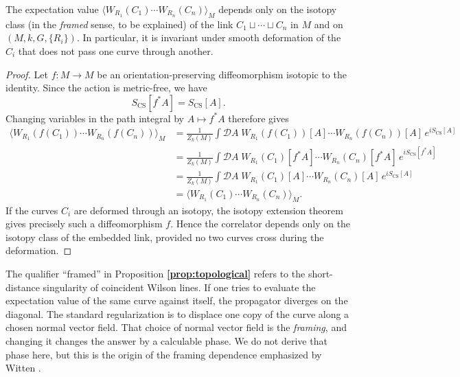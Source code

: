 \documentclass[11pt]{article}
\newcommand{\CS}{\operatorname{CS}}
\theoremstyle{definition}
\numberwithin{theorem}{section}
\numberwithin{equation}{section}
\begin{document}
\begin{proposition}\label{prop:topological}
The expectation value $\langle W_{R_1}(C_1)\cdots W_{R_n}(C_n)\rangle_M$ depends only on the isotopy class (in the \emph{framed} sense, to be explained) of the link $C_1\sqcup \cdots \sqcup C_n$ in $M$ and on $(M,k,G,\{R_i\})$. In particular, it is invariant under smooth deformation of the $C_i$ that does not pass one curve through another.
\end{proposition}

\begin{proof}
Let $f:M\to M$ be an orientation-preserving diffeomorphism isotopic to the identity. Since the action is metric-free, we have
\begin{equation*}
S_{\CS}[f^*A] = S_{\CS}[A].
\end{equation*}
Changing variables in the path integral by $A\mapsto f^*A$ therefore gives
\begin{align*}
\langle W_{R_1}(f(C_1))\cdots W_{R_n}(f(C_n))\rangle_M
&=
\frac{1}{Z_k(M)}
\int \mathcal{D}A\;
W_{R_1}(f(C_1))[A]\cdots W_{R_n}(f(C_n))[A]\,
e^{iS_{\CS}[A]} \\
&=
\frac{1}{Z_k(M)}
\int \mathcal{D}A\;
W_{R_1}(C_1)[f^*A]\cdots W_{R_n}(C_n)[f^*A]\,
e^{iS_{\CS}[f^*A]} \\
&=
\frac{1}{Z_k(M)}
\int \mathcal{D}A\;
W_{R_1}(C_1)[A]\cdots W_{R_n}(C_n)[A]\,
e^{iS_{\CS}[A]} \\
&=
\langle W_{R_1}(C_1)\cdots W_{R_n}(C_n)\rangle_M.
\end{align*}
If the curves $C_i$ are deformed through an isotopy, the isotopy extension theorem gives precisely such a diffeomorphism $f$. Hence the correlator depends only on the isotopy class of the embedded link, provided no two curves cross during the deformation.
\end{proof}

\noindent The qualifier ``framed'' in Proposition \textbf{\ref{prop:topological}} refers to the short-distance singularity of coincident Wilson lines. If one tries to evaluate the expectation value of the same curve against itself, the propagator diverges on the diagonal. The standard regularization is to displace one copy of the curve along a chosen normal vector field. That choice of normal vector field is the \emph{framing}, and changing it changes the answer by a calculable phase. We do not derive that phase here, but this is the origin of the framing dependence emphasized by Witten \cite{Witten1989Jones}.
\end{document}
